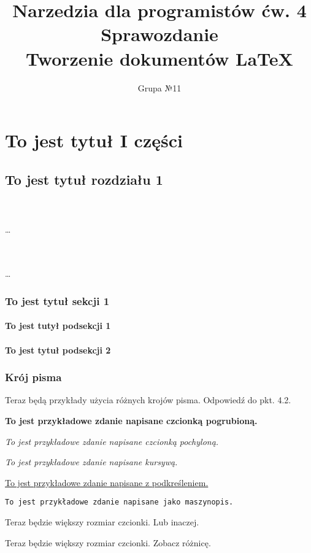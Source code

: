 \documentclass[a4paper, 12pt]{book}
\title{Narzedzia dla programistów ćw. 4\\Sprawozdanie\\Tworzenie dokumentów \LaTeX}
\author{Grupa №11}
\date{}
\begin{document}
\maketitle
\tableofcontents
\listoffigures
\listoftables

\part{To jest tytuł I części}
\chapter{To jest tytuł rozdziału 1}


\textbf{\blindtext \\ \\}
\ldots

\blindtext \\ \\
\ldots
\clearpage

\section{To jest tytuł sekcji 1}
\blindtext
\subsection{To jest tutył podsekcji 1}
\blindtext
\subsection{To jest tytuł podsekcji 2}
\blindtext
\clearpage
\section{Krój pisma} \label{pismo}
Teraz będą przykłady użycia różnych krojów pisma. Odpowiedź do pkt. 4.2.

\textbf{To jest przykładowe zdanie napisane czcionką pogrubioną.}

\emph{To jest przykładowe zdanie napisane czcionką pochyloną.}

\textit{To jest przykładowe zdanie napisane kursywą.}

\underline{To jest przykładowe zdanie napisane z podkreśleniem.}

\verb|To jest przykładowe zdanie napisane jako maszynopis.|

Teraz będzie {\Large większy rozmiar czcionki.} Lub inaczej.

Teraz będzie {\Large większy rozmiar czcionki.} Zobacz różnicę.
\end{document}

